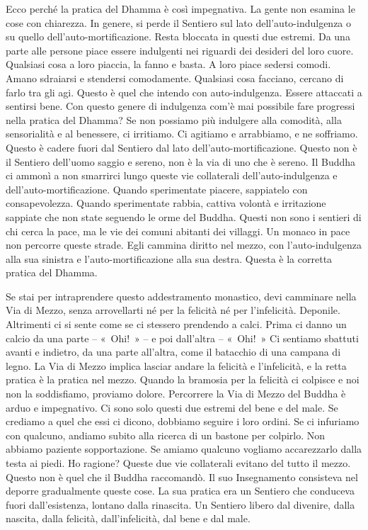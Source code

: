Ecco perché la pratica del Dhamma è così impegnativa. La gente non
esamina le cose con chiarezza. In genere, si perde il Sentiero sul lato
dell'auto-indulgenza o su quello dell'auto-mortificazione. Resta
bloccata in questi due estremi. Da una parte alle persone piace essere
indulgenti nei riguardi dei desideri del loro cuore. Qualsiasi cosa a
loro piaccia, la fanno e basta. A loro piace sedersi comodi. Amano
sdraiarsi e stendersi comodamente. Qualsiasi cosa facciano, cercano di
farlo tra gli agi. Questo è quel che intendo con auto-indulgenza. Essere
attaccati a sentirsi bene. Con questo genere di indulgenza com'è mai
possibile fare progressi nella pratica del Dhamma? Se non possiamo più
indulgere alla comodità, alla sensorialità e al benessere, ci irritiamo.
Ci agitiamo e arrabbiamo, e ne soffriamo. Questo è cadere fuori dal
Sentiero dal lato dell'auto-mortificazione. Questo non è il Sentiero
dell'uomo saggio e sereno, non è la via di uno che è sereno. Il Buddha
ci ammonì a non smarrirci lungo queste vie collaterali
dell'auto-indulgenza e dell'auto-mortificazione. Quando sperimentate
piacere, sappiatelo con consapevolezza. Quando sperimentate rabbia,
cattiva volontà e irritazione sappiate che non state seguendo le orme
del Buddha. Questi non sono i sentieri di chi cerca la pace, ma le vie
dei comuni abitanti dei villaggi. Un monaco in pace non percorre queste
strade. Egli cammina diritto nel mezzo, con l'auto-indulgenza alla sua
sinistra e l'auto-mortificazione alla sua destra. Questa è la corretta
pratica del Dhamma.

Se stai per intraprendere questo addestramento monastico, devi camminare
nella Via di Mezzo, senza arrovellarti né per la felicità né per
l'infelicità. Deponile. Altrimenti ci si sente come se ci stessero
prendendo a calci. Prima ci danno un calcio da una parte -- «~Ohi!~» --
e poi dall'altra -- «~Ohi!~» Ci sentiamo sbattuti avanti e indietro, da
una parte all'altra, come il batacchio di una campana di legno. La Via
di Mezzo implica lasciar andare la felicità e l'infelicità, e la retta
pratica è la pratica nel mezzo. Quando la bramosia per la felicità ci
colpisce e noi non la soddisfiamo, proviamo dolore. Percorrere la Via di
Mezzo del Buddha è arduo e impegnativo. Ci sono solo questi due estremi
del bene e del male. Se crediamo a quel che essi ci dicono, dobbiamo
seguire i loro ordini. Se ci infuriamo con qualcuno, andiamo subito alla
ricerca di un bastone per colpirlo. Non abbiamo paziente sopportazione.
Se amiamo qualcuno vogliamo accarezzarlo dalla testa ai piedi. Ho
ragione? Queste due vie collaterali evitano del tutto il mezzo. Questo
non è quel che il Buddha raccomandò. Il suo Insegnamento consisteva nel
deporre gradualmente queste cose. La sua pratica era un Sentiero che
conduceva fuori dall'esistenza, lontano dalla rinascita. Un Sentiero
libero dal divenire, dalla nascita, dalla felicità, dall'infelicità, dal
bene e dal male.

